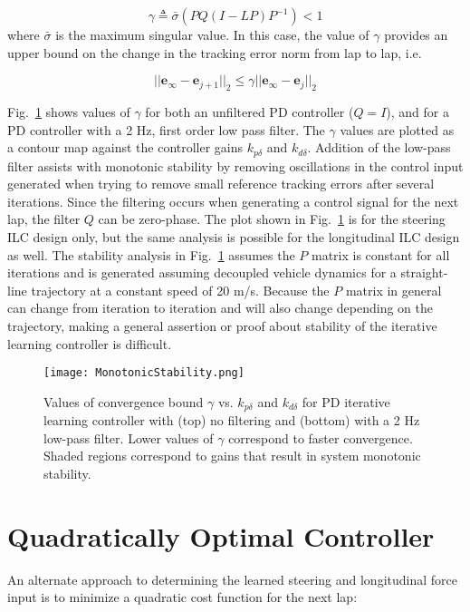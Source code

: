 \begin{equation}
	\gamma \triangleq \bar{\sigma}(PQ(I-LP)P^{-1}) < 1
	\label{eq:MS}
\end{equation}
where $\bar{\sigma}$ is the maximum singular value. In this case, the value of $\gamma$ provides an upper bound on the change
 in the tracking error norm from lap to lap, i.e. 
 
\begin{equation}
	||\mathbf{e}_\infty - \mathbf{e}_{j+1}||_2 \leq \gamma ||\mathbf{e}_\infty-\mathbf{e}_j||_2
\end{equation}

Fig.~\ref{fig:stabPlot} shows values of $\gamma$ for both an unfiltered PD controller ($Q = I$), and for a PD controller with a 2 Hz, first order low pass filter. The $\gamma$ values are plotted as a
contour map against the controller gains $k_{p\delta}$ and $k_{d\delta}$. Addition of the low-pass filter
assists with monotonic stability by removing oscillations in the control input generated when trying to remove small reference tracking
errors after several iterations. Since the filtering occurs when generating a control signal for the next lap, the filter $Q$ can be zero-phase. 
The plot shown in Fig.~\ref{fig:stabPlot} is for the steering ILC design only, but the same analysis is possible for the longitudinal
ILC design as well. The stability analysis in Fig.~\ref{fig:stabPlot} assumes the $P$ 
matrix is constant for all iterations and is generated assuming decoupled vehicle dynamics
 for a straight-line trajectory at a constant speed of 20 m/s. Because the $P$ matrix in general can change from iteration to iteration and will also
 change depending on the trajectory, making a general assertion or proof about stability of the iterative learning controller is difficult. 

\begin{figure}[tb]
\centering
\texttt{[image: MonotonicStability.png]}
\caption[Values of convergence bound $\gamma$ vs. $k_{p\delta}$ and $k_{d\delta}$ for PD iterative learning controller]{Values of convergence bound $\gamma$ vs. $k_{p\delta}$ and $k_{d\delta}$ for PD iterative learning controller with (top) no filtering and (bottom) with a 2 Hz low-pass filter. Lower values of $\gamma$ correspond to faster convergence.
Shaded regions correspond to gains that result in system monotonic stability. }
\label{fig:stabPlot}
\end{figure}


\section{Quadratically Optimal Controller}\label{sec:controller}
\label{sec:qopt}
An alternate approach to determining the learned steering and longitudinal force input is to minimize a quadratic cost function for the next lap:

